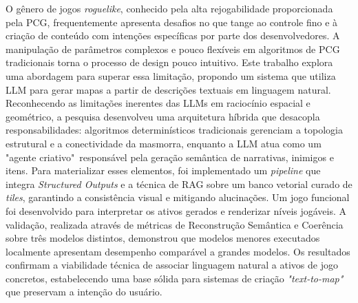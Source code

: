 O gênero de jogos \textit{roguelike}, conhecido pela alta rejogabilidade
proporcionada pela \gls{PCG}, frequentemente apresenta desafios no que tange ao
controle fino e à criação de conteúdo com intenções específicas por parte dos
desenvolvedores. A manipulação de parâmetros complexos e pouco flexíveis em
algoritmos de \gls{PCG} tradicionais torna o processo de design pouco intuitivo.
Este trabalho explora uma abordagem para superar essa limitação, propondo um
sistema que utiliza \gls{LLM} para gerar mapas a partir de descrições textuais
em linguagem natural.  Reconhecendo as limitações inerentes das LLMs em
raciocínio espacial e geométrico, a pesquisa desenvolveu uma arquitetura híbrida
que desacopla responsabilidades: algoritmos determinísticos tradicionais
gerenciam a topologia estrutural e a conectividade da masmorra, enquanto a
\gls{LLM} atua como um "agente criativo"\ responsável pela geração semântica de
narrativas, inimigos e itens.  Para materializar esses elementos, foi
implementado um \textit{pipeline} que integra \textit{Structured Outputs} e a
técnica de \gls{RAG} sobre um banco vetorial curado de \textit{tiles},
garantindo a consistência visual e mitigando alucinações. Um jogo funcional foi
desenvolvido para interpretar os ativos gerados e renderizar níveis jogáveis. A
validação, realizada através de métricas de Reconstrução Semântica e Coerência
sobre três modelos distintos, demonstrou que modelos menores executados
localmente apresentam desempenho comparável a grandes modelos. Os resultados
confirmam a viabilidade técnica de associar linguagem natural a ativos de jogo
concretos, estabelecendo uma base sólida para sistemas de criação
\textit{"text-to-map"} que preservam a intenção do usuário.

